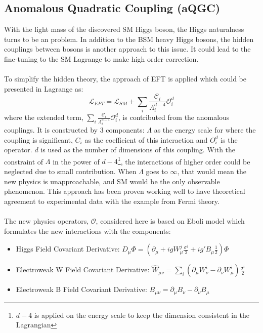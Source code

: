 \subsection{Anomalous Quadratic Coupling (aQGC)}
With the light mass of the discovered SM Higgs boson, the Higgs naturalness turns to be an problem. In addition to the BSM heavy Higgs bosons, the hidden couplings between bosons is another approach to this issue. It could lead to the fine-tuning to the SM Lagrange to make high order correction. 
\\
\\To simplify the hidden theory, the approach of EFT is applied which could be presented in Lagrange as:
\begin{equation}
\mathcal{L}_{EFT} = \mathcal{L}_{SM} + \sum_{i}\frac{\mathcal{C}_i}{\Lambda_{i}^{d-4}}\mathcal{O}^{d}_{i}
\end{equation}
where the extended term, $\sum_{i}\frac{\mathcal{C}_i}{\Lambda_{i}^{d-4}}\mathcal{O}^{d}_{i}$, is contributed from the anomalous couplings. It is constructed by 3 components: $\Lambda$ as the energy scale for where the coupling is significant, $C_{i}$ as the coefficient of this interaction and $O^{d}_i$ is the operator. $d$ is used as the number of dimensions of this coupling. With the constraint of $\Lambda$ in the power of $d-4$\footnote{$d-4$ is applied on the energy scale to keep the dimension consistent in the Lagrangian}, the interactions of higher order could be neglected due to small contribution. When $\Lambda$ goes to $\infty$, that would mean the new physics is unapproachable, and SM would be the only observable phenomenon. This approach has been proven working well to have theoretical agreement to experimental data with the example from Fermi theory. 
\\
\\The new physics operators, $\mathcal{O}$, considered here is based on Eboli model\cite{Eboli:2016kko,Eboli:2000ad} which formulates the new interactions with the components:
\begin{itemize}
	\item{Higgs Field Covariant Derivative}: $D_{\mu}\Phi =(\partial_\mu + igW^j_{\mu}\frac{\sigma^{j}}{2}+ig'B_\mu\frac{1}{2})\Phi $
	\item{Electroweak W Field Covariant Derivative}: $\hat{W}_{\mu\nu}=\sum_{i}(\partial_\mu W_\nu^i - \partial_\nu W_\mu^i)\frac{\sigma^i}{2}$
	\item{Electroweak B Field Covariant Derivative}: $B_{\mu\nu} = \partial_\mu B_\nu - \partial_\nu B_\mu$
\end{itemize}
